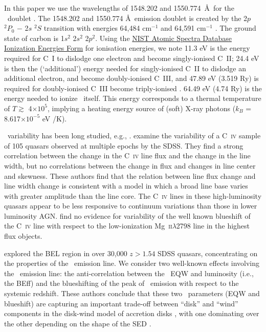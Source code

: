 \documentclass[a4paper,fleqn,usenatbib]{mnras}
\begin{document}
In this paper we use the wavelengths of 1548.202 and 1550.774~\AA\ for
the \civ\ doublet \citep{Kramida2018}.  The 1548.202 and 1550.774 \AA\
emission doublet is created by the 2$p$ $^{2}P_{0}$ $-$ 2$s$ $^{2}S$
transition with energies 64,484 cm$^{-1}$ and 64,591 cm$^{-1}$
\citep[e.g.][]{Moore1993}.  The ground state of carbon is 1$s^2$
2$s^2$ 2$p^2$.  Using the
\href{https://physics.nist.gov/PhysRefData/ASD/ionEnergy.html}{NIST
Atomic Spectra Database Ionization Energies Form} for ionisation
energies, we note 11.3 eV is the energy required for C~I to dislodge
one electron and become singly-ionised C~II; 24.4 eV is then the
(`additional') energy needed for singly-ionised C~II to dislodge an
additional electron, and become doubly-ionised C~III, and 47.89 eV
(3.519 Ry) is required for doubly-ionised C~III become triply-ionised
\civ.  64.49 eV (4.74 Ry) is the energy needed to ionize \civ\
itself. This energy corresponds to a thermal temperature of $T
\gtrsim$ 4$\times10^{5}$, implying a heating energy source of (soft)
X-ray photons ($k_{B}$ = 8.617$\times 10^{-5}$ eV /K).



\civ\ variability has been long studied, e.g., \citet[][]{Baldwin1977,
Gaskell1982, Gregory1982, Wilkes1986, Espey1989, Espey1990Erratum,
ZhengSulentic1990, Corbin1990, Corbin1991, Weymann1991,
Dimitrijevic1992, TytlerFan1992, Wills1993, Brotherton1994, Osmer1994,
Laor1995, McIntosh1999, Nazarova2003}.  \citet{Wilhite2006} examine
the variability of a C~\textsc{iv} sample of 105 quasars observed at
multiple epochs by the SDSS.  They find a strong correlation between
the change in the C~\textsc{iv} line flux and the change in the line
width, but no correlations between the change in flux and changes in
line center and skewness.  These authors find that the relation
between line flux change and line width change is consistent with a
model in which a broad line base varies with greater amplitude than
the line core. The C~\textsc{iv} lines in these high-luminosity
quasars appear to be less responsive to continuum variations than
those in lower luminosity AGN.  \citet{Wilhite2006} find no evidence
for variability of the well known blueshift of the C~\textsc{iv} line
with respect to the low-ionization Mg~\textsc{ii}$\lambda$2798 line in
the highest flux objects.

\citet{Richards2011} explored the BEL region in over 30,000 $z > 1.54$ SDSS
quasars, concentrating on the properties of the \civ\ emission
line. We consider two well-known effects involving the \civ\ emission
line: the anti-correlation between the \civ\ EQW and luminosity (i.e.,
the BEff) and the blueshifting of the peak of \civ\ emission with
respect to the systemic redshift. These authors conclude that these
two \civ\ parameters (EQW and blueshift) are capturing an important
trade-off between ``disk'' and ``wind'' components in the disk-wind
model of accretion disks \citep[e.g.,][]{Murray1995, Elvis2000,
Proga2000}, with one dominating over the other depending on the shape
of the SED \citep[][strong \civ\ EQW indicates a more ionizing SED and
large \civ\ blueshift indicating a less ionizing SED ]{Leighly2004b}.
\end{document}
